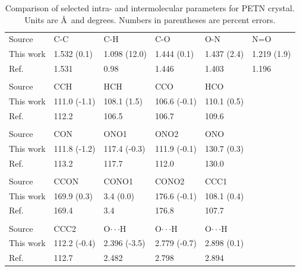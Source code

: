 \documentclass[prb,aps,nobibnotes,twocolumn,doublespace,twocolumngrid,superbib]{revtex4}
\begin{document}
\begin{table}[p]
\begin{center}
\begin{tabular}{llllll}
\hline\hline
Source & C-C & C-H & C-O & O-N & N=O  \\
This work & 1.532 (0.1) & 1.098 (12.0) & 1.444 (0.1) &  1.437 (2.4) & 1.219 (1.9) \\
Ref.\cite{Conant_1979} &  1.531   &   0.98  & 1.446  &  1.403 &   1.196 \\
\hline
\\
Source  &  CCH   &        HCH     &      CCO    &       HCO \\
This work & 111.0 (-1.1)  & 108.1  (1.5) &  106.6 (-0.1) & 110.1 (0.5) \\
Ref.\cite{Conant_1979} &  112.2    &  106.5  &  106.7   & 109.6 \\
\hline
\\
Source   &  CON     &       ONO1   &        ONO2     &      ONO \\
This work&  111.8 (-1.2) &  117.4 (-0.3)&  111.9 (-0.1)&  130.7 (0.3)\\
Ref.\cite{Conant_1979} &    113.2   &       117.7   &       112.0   &       130.0\\
\hline\\
Source &    CCON    &       CONO1   &       CONO2    &   CCC1\\
This work &  169.9 (0.3) &   3.4 (0.0) &     176.6 (-0.1) & 108.1 (0.4)\\
Ref.\cite{Conant_1979} &   169.4   &       3.4     &       176.8        & 107.7\\
\hline\\
Source &  CCC2 &  O$\cdot\cdot\cdot$H   &       O$\cdot\cdot\cdot$H   &       O$\cdot\cdot\cdot$H\\
This work &  112.2 (-0.4) & 2.396 (-3.5) &   2.779 (-0.7) & 2.898 (0.1)\\
Ref.\cite{Conant_1979} &   112.7 & 2.482   &       2.798   &       2.894\\
\hline\hline
\end{tabular}
\end{center}
\caption{Comparison of selected intra- and intermolecular parameters for
PETN crystal.  Units are \AA\ and degrees.  Numbers in parentheses
are percent errors.
}
\label{tab:table2}
\end{table}
\end{document}
